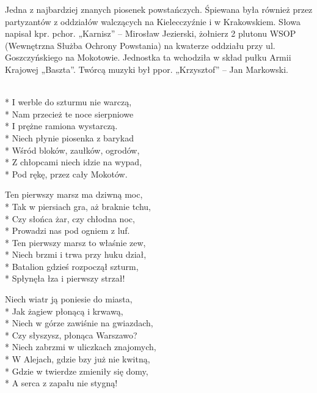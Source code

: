 \begin{info}Jedna z najbardziej znanych piosenek powstańczych. Śpiewana była również przez partyzantów z oddziałów walczących na Kielecczyźnie i w Krakowskiem. Słowa napisał kpr. pchor. „Karnisz” – Mirosław Jezierski, żołnierz 2 plutonu WSOP (Wewnętrzna Służba Ochrony Powstania) na kwaterze oddziału przy ul. Goszczyńskiego na Mokotowie. Jednostka ta wchodziła w skład pułku Armii Krajowej „Baszta”. Twórcą muzyki był ppor. „Krzysztof” – Jan Markowski.\end{info}

\begin{lyrics}[longestline={\vin Ten pierwszy marsz niech dzień po dniu,}]

\\*
I werble do szturmu nie warczą,\\*
Nam przecież te noce sierpniowe\\*
I prężne ramiona wystarczą.\\*
\smallskip
Niech płynie piosenka z barykad\\*
Wśród bloków, zaułków, ogrodów,\\*
Z chłopcami niech idzie na wypad,\\*
Pod rękę, przez cały Mokotów.

\vin Ten pierwszy marsz ma dziwną moc,\\*
\vin Tak w piersiach gra, aż braknie tchu,\\*
\vin Czy słońca żar, czy chłodna noc,\\*
\vin Prowadzi nas pod ogniem z luf.\\*
\vin Ten pierwszy marsz to właśnie zew,\\*
\vin Niech brzmi i trwa przy huku dział,\\*
\vin Batalion gdzieś rozpoczął szturm,\\*
\vin Spłynęła łza i pierwszy strzał!

Niech wiatr ją poniesie do miasta,\\*
Jak żagiew płonącą i krwawą,\\*
Niech w górze zawiśnie na gwiazdach,\\*
Czy słyszysz, płonąca Warszawo?\\*
\smallskip
Niech zabrzmi w uliczkach znajomych,\\*
W Alejach, gdzie bzy już nie kwitną,\\*
Gdzie w twierdze zmieniły się domy,\\*
A serca z zapału nie stygną!


\end{lyrics}
